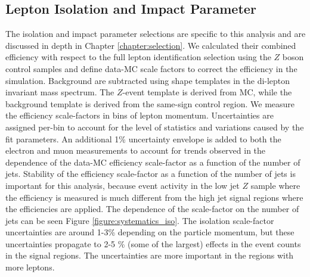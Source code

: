 \subsection{Lepton Isolation and Impact Parameter}

The isolation and impact parameter selections are specific to this analysis and are discussed in depth in Chapter \ref{chapter:selection}. We calculated their combined efficiency with respect to the full lepton identification selection using the $Z$ boson control samples and define data-MC scale factors to correct the efficiency in the simulation. Background are subtracted using shape templates in the di-lepton invariant mass spectrum. The $Z$-event template is derived from MC, while the background template is derived from the same-sign control region. We measure the efficiency scale-factors in bins of lepton momentum. Uncertainties are assigned per-bin to account for the level of statistics and variations caused by the fit parameters. An additional 1\% uncertainty envelope is added to both the electron and muon measurements to account for trends observed in the dependence of the data-MC efficiency scale-factor as a function of the number of jets. Stability of the efficiency scale-factor as a function of the number of jets is important for this analysis, because event activity in the low jet $Z$ sample where the efficiency is measured is much different from the high jet signal regions where the efficiencies are applied. The dependence of the scale-factor on the number of jets can be seen Figure \ref{figure:systematics_iso}. The isolation scale-factor uncertainties are around 1-3\% depending on the particle momentum, but these uncertainties propagate to 2-5 \% (some of the largest) effects in the event counts in the signal regions. The uncertainties are more important in the regions with more leptons. 


